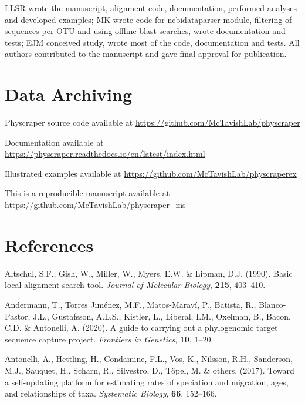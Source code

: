 \documentclass[]{article}
\begin{document}
LLSR wrote the manuscript, alignment code, documentation, performed analyses and developed examples; MK wrote code for ncbidataparser module, filtering of sequences per OTU and using offline blast searches, wrote documentation and tests; EJM conceived study, wrote most of the code, documentation and tests.
All authors contributed to the manuscript and gave final approval for publication.

\hypertarget{data-archiving}{%
\section{Data Archiving}\label{data-archiving}}

Physcraper source code available at \url{https://github.com/McTavishLab/physcraper}

Documentation available at \url{https://physcraper.readthedocs.io/en/latest/index.html}

Illustrated examples available at \url{https://github.com/McTavishLab/physcraperex}

This is a reproducible manuscript available at \url{https://github.com/McTavishLab/physcraper_ms}

\hypertarget{references}{%
\section*{References}\label{references}}

\hypertarget{refs}{}
\leavevmode\hypertarget{ref-altschul1990basic}{}%
Altschul, S.F., Gish, W., Miller, W., Myers, E.W. \& Lipman, D.J. (1990). Basic local alignment search tool. \emph{Journal of Molecular Biology}, \textbf{215}, 403--410.

\leavevmode\hypertarget{ref-andermann2020guide}{}%
Andermann, T., Torres Jiménez, M.F., Matos-Maraví, P., Batista, R., Blanco-Pastor, J.L., Gustafsson, A.L.S., Kistler, L., Liberal, I.M., Oxelman, B., Bacon, C.D. \& Antonelli, A. (2020). A guide to carrying out a phylogenomic target sequence capture project. \emph{Frontiers in Genetics}, \textbf{10}, 1--20.

\leavevmode\hypertarget{ref-antonelli2017toward}{}%
Antonelli, A., Hettling, H., Condamine, F.L., Vos, K., Nilsson, R.H., Sanderson, M.J., Sauquet, H., Scharn, R., Silvestro, D., Töpel, M. \& others. (2017). Toward a self-updating platform for estimating rates of speciation and migration, ages, and relationships of taxa. \emph{Systematic Biology}, \textbf{66}, 152--166.
\end{document}
